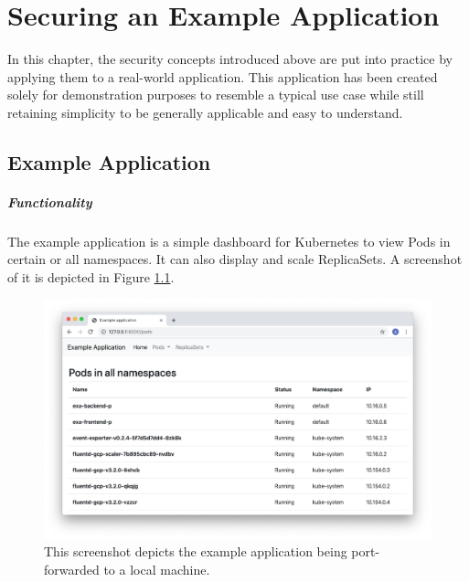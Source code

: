 \chapter{Securing an Example Application}

In this chapter, the security concepts introduced above are put into practice by applying them to a real-world application. This application has been created solely for demonstration purposes to resemble a typical use case while still retaining simplicity to be generally applicable and easy to understand.

\section{Example Application}

\paragraph{Functionality}

The example application is a simple dashboard for Kubernetes to view Pods in certain or all namespaces. It can also display and scale ReplicaSets. A screenshot of it is depicted in Figure \ref{fig:exaScreenshot}.

\begin{figure}[H]
\begin{center}
    \includegraphics[width=1.0\linewidth]{figures/exa_screenshot.png}
    \caption[Screenshot of the example application]{This screenshot depicts the example application being port-forwarded to a local machine.}
    \label{fig:exaScreenshot}
\end{center}
\end{figure}

